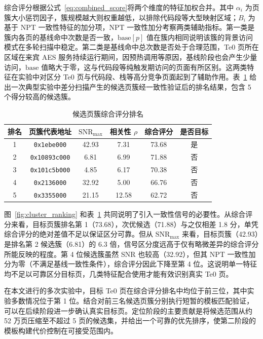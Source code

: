 综合评分根据公式~\eqref{eq:combined_score}将两个维度的特征加权合并。其中 $\alpha_i$ 为页簇大小惩罚因子，簇规模越大则权重越低，以排除代码段等大型映射区域；$B_i$ 为基于 NPT 一致性特征的加分项，NPT 一致性加分考察两类辅助指标。第一类是簇内各页的基线命中次数是否一致，$\mathrm{base}[p]$ 值在簇内相同说明该簇的背景访问模式在多轮扫描中稳定。第二类是基线命中总次数是否处于合理范围，Te0 页所在区域在来宾 AES 服务持续运行期间，因预热调用等原因，基线阶段也会产生少量访问，$\mathrm{base}$ 值略大于零，这与代码段等纯触发期访问的页面有所区别。这两类特征在实验中对区分 Te0 页与代码段、栈等高分竞争页面起到了辅助作用。表~\ref{tab:phase1_cluster_ranking} 给出一次典型实验中差分扫描产生的候选页簇经一致性验证后的排名结果，包含 5 个得分较高的候选簇。

\begin{table}[htbp]
  \centering
  \caption{候选页簇综合评分排名}
  \label{tab:phase1_cluster_ranking}
  \begin{tabular}{cccccc}
    \toprule
    排名 & 页簇代表地址 & $\mathrm{SNR}_{\max}$ & 相关性 $\rho$ & 综合评分 & 是否目标 \\
    \midrule
    1 & \texttt{0x1ebe000}    & 42.93 & 7.31  & 73.68 & 是 \\
    2 & \texttt{0x10893c000}  &  6.81 & 6.99  & 71.88 & 否 \\
    3 & \texttt{0x101c5b000}  &  4.85 & 6.17  & 70.38 & 否 \\
    4 & \texttt{0x2136000}    & 32.92 & 5.00  & 66.76 & 否 \\
    5 & \texttt{0x3355000}    & 21.15 & 12.58 & 62.72 & 否 \\
    \bottomrule
  \end{tabular}
\end{table}

图~\ref{fig:cluster_ranking} 和表~\ref{tab:phase1_cluster_ranking} 共同说明了引入一致性信号的必要性。从综合评分来看，目标页簇排名第 1（73.68），次优候选（71.88）与之仅相差 1.8 分，单凭综合评分的绝对差值不足以保证区分可靠。但从 $\mathrm{SNR}_{\max}$ 来看，目标页簇（42.93）是排名第 2 候选簇（6.81）的 6.3 倍，信号区分度远高于仅有略微差异的综合评分所能反映的程度。第 4 位候选簇虽然 SNR 也较高（32.92），但其 NPT 一致性加分为零（不满足基线一致性条件），综合评分因此下降至第 4 位。这说明单一特征均不足以可靠区分目标页，几类特征配合使用才能有效识别真实 Te0 页。

在本文进行的多次实验中，目标 Te0 页在综合评分排名中均位于前三位，其中实验多数情况位于第 1 位。结合对前三名候选页簇分别执行短暂的模板匹配验证，可以在后续阶段进一步确认真实目标页。定位阶段的主要贡献是将候选范围从约 52 万页压缩至不超过 5 页的候选集，并给出一个可靠的优先排序，使第二阶段的模板构建代价控制在可接受范围内。

